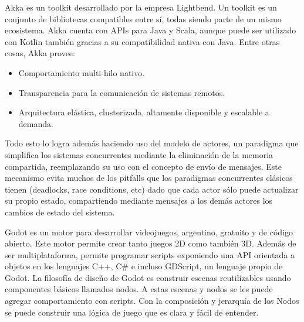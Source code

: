 
\noindent Akka es un toolkit desarrollado por la empresa Lightbend. Un toolkit es un conjunto de 
bibliotecas compatibles entre sí, todas siendo parte de un mismo ecosistema. 
Akka cuenta con APIs para Java y Scala, aunque puede ser utilizado con Kotlin también 
gracias a su compatibilidad nativa con Java. Entre otras cosas, Akka provee:

\begin{itemize}
    \item Comportamiento multi-hilo nativo.
    \item Transparencia para la comunicación de sistemas remotos.
    \item Arquitectura elástica, clusterizada, altamente disponible y escalable a demanda.
\end{itemize}

Todo esto lo logra además haciendo uso del modelo de actores, un paradigma que simplifica 
los sistemas concurrentes mediante la eliminación de la memoria compartida, reemplazando su uso 
con el concepto de envío de mensajes. Este mecanismo evita muchos de los pitfalls que los paradigmas 
concurrentes clásicos tienen (deadlocks, race conditions, etc) dado que cada actor sólo puede 
actualizar su propio estado, compartiendo mediante mensajes a los demás actores los cambios de 
estado del sistema.

Godot es un motor para desarrollar videojuegos, argentino, gratuito y de código abierto. 
Este motor permite crear tanto juegos 2D como también 3D. Además de ser multiplataforma, 
permite programar scripts exponiendo una API orientada a objetos en los lenguajes C++, C\# 
e incluso GDScript, un lenguaje propio de Godot.
La filosofía de diseño de Godot es construir escenas reutilizables usando componentes básicos 
llamados nodos. 
A estas escenas y nodos se les puede agregar comportamiento con scripts. 
Con la composición y jerarquía de los Nodos se puede construir una lógica de juego que es clara 
y fácil de entender.


